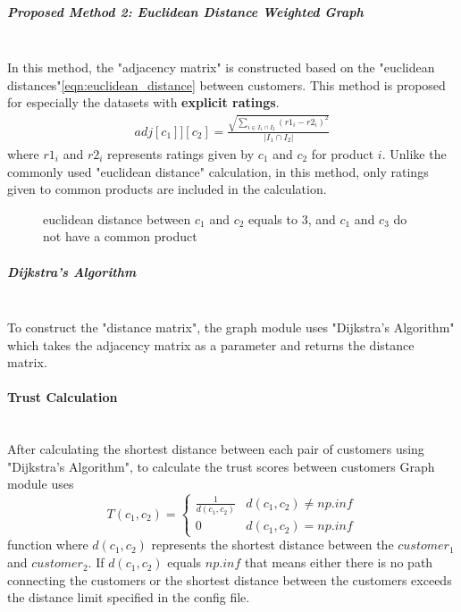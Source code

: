 	\subparagraph{Proposed Method 2: Euclidean Distance Weighted Graph}\mbox{}\\
	\label{prop_method_2}
	In this method, the "adjacency matrix" is constructed based on the "euclidean distances"\ref{eqn:euclidean_distance} between customers. This method is proposed for especially the datasets with \textbf{explicit ratings}.
	\begin{equation} 
	\label{eqn:euclidean_distance}
	\begin{split}
	adj[c_{1}]][c_{2}] = \frac{\sqrt{\sum_{i\in I_{1}\cap I_{2}}^{} (r1_{i}-r2_{i})^2}}{|I_{1}\cap I_{2}|}
	\end{split}
	\end{equation}
	where $r1_{i}$ and $r2_{i}$ represents ratings given by $c_{1}$ and $c_{2}$ for product $i$. Unlike the commonly used "euclidean distance" calculation, in this method, only ratings given to common products are included in the calculation.
	\begin{figure}[H]
		\centering
		\caption{euclidean distance between $c_{1}$ and $c_{2}$ equals to 3, and $c_{1}$ and $c_{3}$ do not have a common product}
	\end{figure}
	
	\subparagraph{Dijkstra's Algorithm}\mbox{}\\
	To construct the "distance matrix", the graph module uses "Dijkstra's Algorithm"\cite{Dijkstra} which takes the adjacency matrix as a parameter and returns the distance matrix.
	
	\paragraph{Trust Calculation}\mbox{}\\
	After calculating the shortest distance between each pair of customers using "Dijkstra's Algorithm", to calculate the trust scores between customers Graph module uses
	\begin{equation*} 
	T(c_{1}, c_{2})= \left\{
	\begin{array}{lr} 
	\frac{1}{d(c_{1}, c_{2})} & d(c_{1}, c_{2}) \neq np.inf \\
	0 & d(c_{1}, c_{2}) = np.inf
	\end{array}
	\right.
	\end{equation*}
	function where $d(c_{1}, c_{2})$ represents the shortest distance between the $customer_{1}$ and $customer_{2}$. If $d(c_{1}, c_{2})$ equals $np.inf$ that means either there is no path connecting the customers or the shortest distance between the customers exceeds the distance limit specified in the config file. \\
	
